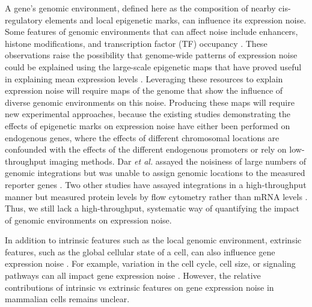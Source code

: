A gene’s genomic environment, defined here as the composition of nearby cis-regulatory elements and local epigenetic marks, can influence its expression noise. Some features of genomic environments that can affect noise include enhancers, histone modifications, and transcription factor (TF) occupancy \cite{wus_qianw:IndependentRegulation2017, darrd_weinbergerls:TranscriptionalBurst2012, larsondr_singerrh:DirectObservation2013, senecala_darzacqx:TranscriptionFactors2014, waltersmc_martindi:EnhancersIncrease1995, weinbergerl_barkain:ExpressionNoise2012,faureaj_lehnerb:SystematicAnalysis2017}. These observations raise the possibility that genome-wide patterns of expression noise could be explained using the large-scale epigenetic maps that have proved useful in explaining mean expression levels \cite{akhtarw_vansteenselb:ChromatinPosition2013,kundajea_kellism:IntegrativeAnalysis2015,karlicr_vingronm:HistoneModification2010}. Leveraging these resources to explain expression noise will require maps of the genome that show the influence of diverse genomic environments on this noise. Producing these maps will require new experimental approaches, because the existing studies demonstrating the effects of epigenetic marks on expression noise have either been performed on endogenous genes, where the effects of different chromosomal locations are confounded with the effects of the different endogenous promoters or rely on low-throughput imaging methods. Dar \textit{et al.} assayed the noisiness of large numbers of genomic integrations but was unable to assign genomic locations to the measured reporter genes \cite{darrd_weinbergerls:TranscriptionalBurst2012}. Two other studies have assayed integrations in a high-throughput manner but measured protein levels by flow cytometry rather than mRNA levels \cite{deyss_arkinap:OrthogonalControl2015,zhangt_wollmanr:IdentifyingChromatin2020}. Thus, we still lack a high-throughput, systematic way of quantifying the impact of genomic environments on expression noise.

In addition to intrinsic features such as the local genomic environment, extrinsic features, such as the global cellular state of a cell, can also influence gene expression noise \cite{elowitzmb_swainps:StochasticGene2002,ozbudakem_vanoudenaardena:RegulationNoise2002,nevesrp_iborrafj:ConnectingVariability2010,stewart-ornsteinj_el-samadh:CellularNoise2012,  sancheza_goldingi:GeneticDeterminants2013}. For example, variation in the cell cycle, cell size, or signaling pathways can all impact gene expression noise \cite{raja_vanoudenaardena:NatureNurture2008, raserjm_osheaek:ControlStochasticity2004, zopfcj_maheshrin:CellCycleDependence2013}. However, the relative contributions of intrinsic vs extrinsic features on gene expression noise in mammalian cells remains unclear.

